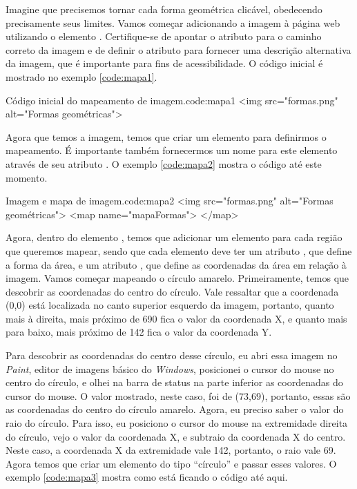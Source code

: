 Imagine que precisemos tornar cada forma geométrica clicável, obedecendo precisamente seus limites. Vamos começar adicionando a imagem à página web utilizando o elemento . Certifique-se de apontar o atributo  para o caminho correto da imagem e de definir o atributo  para fornecer uma descrição alternativa da imagem, que é importante para fins de acessibilidade. O código inicial é mostrado no exemplo \ref{code:mapa1}.

\begin{htmlcode}{Código inicial do mapeamento de imagem.}{code:mapa1}
<img src="formas.png" alt="Formas geométricas">
\end{htmlcode}

Agora que temos a imagem, temos que criar um elemento  para definirmos o mapeamento. É importante também fornecermos um nome para este elemento  através de seu atributo . O exemplo \ref{code:mapa2} mostra o código até este momento.

\begin{htmlcode}{Imagem e mapa de imagem.}{code:mapa2}
<img src="formas.png" alt="Formas geométricas">
<map name="mapaFormas">
</map>
\end{htmlcode}

Agora, dentro do elemento , temos que adicionar um elemento  para cada região que queremos mapear, sendo que cada elemento  deve ter um atributo , que define a forma da área, e um atributo , que define as coordenadas da área em relação à imagem. Vamos começar mapeando o círculo amarelo. Primeiramente, temos que descobrir as coordenadas do centro do círculo. Vale ressaltar que a coordenada (0,0) está localizada no canto superior esquerdo da imagem, portanto, quanto mais à direita, mais próximo de 690 fica o valor da coordenada X, e quanto mais para baixo, mais próximo de 142 fica o valor da coordenada Y.

Para descobrir as coordenadas do centro desse círculo, eu abri essa imagem no \textit{Paint}, editor de imagens básico do \textit{Windows}, posicionei o cursor do mouse no centro do círculo, e olhei na barra de status na parte inferior as coordenadas do cursor do mouse. O valor mostrado, neste caso, foi de (73,69), portanto, essas são as coordenadas do centro do círculo amarelo. Agora, eu preciso saber o valor do raio do círculo. Para isso, eu posiciono o cursor do mouse na extremidade direita do círculo, vejo o valor da coordenada X, e subtraio da coordenada X do centro. Neste caso, a coordenada X da extremidade vale 142, portanto, o raio vale 69. Agora temos que criar um elemento  do tipo ``círculo'' e passar esses valores. O exemplo \ref{code:mapa3} mostra como está ficando o código até aqui.

